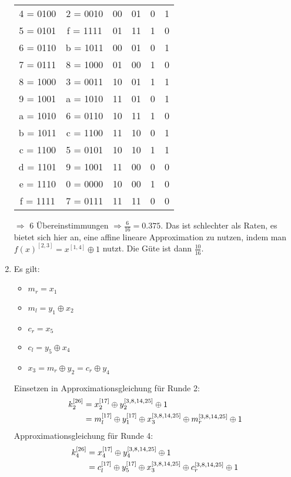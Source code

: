 \documentclass{article}
\begin{document}
\begin{enumerate}[label=(\alph*)]
\begin{center}
\begin{longtable}{c|c|c|c|c|c}
				4 = 0100 & 2 = 0010 & 00 & 01 & 0 & 1 \\
				5 = 0101 & f = 1111 & 01 & 11 & 1 & 0 \\
				6 = 0110 & b = 1011 & 00 & 01 & 0 & 1 \\
				7 = 0111 & 8 = 1000 & 01 & 00 & 1 & 0 \\
				8 = 1000 & 3 = 0011 & 10 & 01 & 1 & 1 \\
				9 = 1001 & a = 1010 & 11 & 01 & 0 & 1 \\
				a = 1010 & 6 = 0110 & 10 & 11 & 1 & 0 \\
				b = 1011 & c = 1100 & 11 & 10 & 0 & 1 \\
				c = 1100 & 5 = 0101 & 10 & 10 & 1 & 1 \\
				d = 1101 & 9 = 1001 & 11 & 00 & 0 & 0 \\
				e = 1110 & 0 = 0000 & 10 & 00 & 1 & 0 \\
				f = 1111 & 7 = 0111 & 11 & 11 & 0 & 0
			\end{longtable}
		\end{center}
		$\Rightarrow$ 6 Übereinstimmungen $\Rightarrow \frac{6}{16} = 0.375$. Das ist schlechter als Raten, es bietet sich hier an, eine affine lineare Approximation zu nutzen, indem man $f(x)^{[2,3]} = x^{[1,4]} \oplus 1$ nutzt. Die Güte ist dann $\frac{10}{16}$.
		\item Es gilt:
		\begin{itemize}
			\item $m_r = x_1$
			\item $m_l = y_1 \oplus x_2$
			\item $c_r = x_5$
			\item $c_l = y_5 \oplus x_4$
			\item $x_3 = m_r \oplus y_2 = c_r \oplus y_4$
		\end{itemize}
		Einsetzen in Approximationsgleichung für Runde 2:
		\begin{align}
			k_2^{[26]} &= x_2^{[17]} \oplus y_2^{[3,8,14,25]} \oplus 1 \notag \\
			&= m_l^{[17]} \oplus y_1^{[17]} \oplus x_3^{[3,8,14,25]} \oplus m_r^{[3,8,14,25]} \oplus 1 \notag
		\end{align}
		Approximationsgleichung für Runde 4:
		\begin{align}
			k_4^{[26]} &= x_4^{[17]} \oplus y_4^{[3,8,14,25]} \oplus 1 \notag \\
			&= c_l^{[17]} \oplus y_5^{[17]} \oplus x_3^{[3,8,14,25]} \oplus c_r^{[3,8,14,25]} \oplus 1 \notag
		\end{align}

\end{enumerate}
\end{document}
